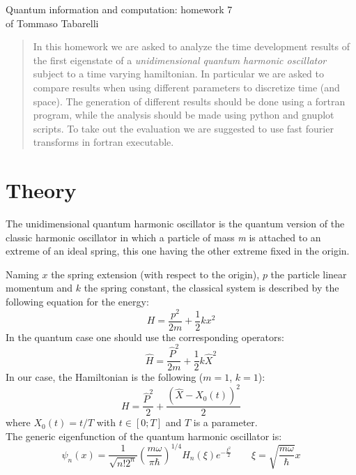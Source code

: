 \documentclass[12pt, a4paper, notitlepage]{report}
\begin{document}
\begin{center}
	\LARGE{Quantum information and computation: homework 7}\\
	\Large{of Tommaso Tabarelli}
\end{center}


\begin{abstract}
	In this homework we are asked to analyze the time development results of the first eigenstate of a \textit{unidimensional quantum harmonic oscillator} subject to a time varying hamiltonian. In particular we are asked to compare results when using different parameters to discretize time (and space). The generation of different results should be done using a fortran program, while the analysis should be made using python and gnuplot scripts.
	To take out the evaluation we are suggested to use fast fourier transforms in fortran executable.
\end{abstract}

\section*{Theory}

The unidimensional quantum harmonic oscillator is the quantum version of the classic harmonic oscillator in which a particle of mass \textit{m} is attached to an extreme of an ideal spring, this one having the other extreme fixed in the origin.

Naming $x$ the spring extension (with respect to the origin), $p$ the particle linear momentum and $k$ the spring constant, the classical system is described by the following equation for the energy:
\begin{equation}
	H = \frac{p^2}{2m} + \frac{1}{2} k x^2
\end{equation}
In the quantum case one should use the corresponding operators:
\begin{equation}
	\hat{H} = \frac{\hat{P}^2}{2m} + \frac{1}{2} k \hat{X}^2
\end{equation}
In our case, the Hamiltonian is the following ($m=1$, $k=1$):
\begin{equation}
H = \frac{\hat{P}^2}{2} + \frac{\left( \hat{X} - X_0(t) \right)^2}{2} 
\end{equation}
where $X_0(t) = t/T$ with $t \in \left[ 0; T\right]$ and $T$ is a parameter.\\

The generic eigenfunction of the quantum harmonic oscillator is:
\begin{equation}
\psi_n (x) = \frac{1}{\sqrt{n! 2^n}} \left( \frac{m \omega}{\pi \hbar} \right)^{1/4} H_n(\xi) e^{-\frac{\xi^2}{2}} \qquad \xi = \sqrt{\frac{m \omega}{\hbar}} x
\end{equation}
\end{document}
